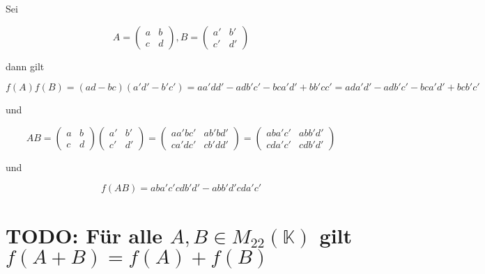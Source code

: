 \documentclass{article}
\begin{document}
Sei

\[
A=
  \begin{pmatrix}
    a & b \\
    c & d
  \end{pmatrix}
,
B=
  \begin{pmatrix}
    a' & b' \\
    c' & d'
  \end{pmatrix}
\]

dann gilt

\[
f(A)f(B)=(ad - bc)(a'd' - b'c') = aa'dd' - adb'c' - bca'd' + bb'cc'
= ada'd' - adb'c' - bca'd' + bcb'c'
\]

und

\[
AB=
  \begin{pmatrix}
    a & b \\
    c & d
  \end{pmatrix}
  \begin{pmatrix}
    a' & b' \\
    c' & d'
  \end{pmatrix}
  =
  \begin{pmatrix}
    aa'bc' & ab'bd' \\
    ca'dc' & cb'dd'
  \end{pmatrix}
  =
  \begin{pmatrix}
    aba'c' & abb'd' \\
    cda'c' & cdb'd'
  \end{pmatrix}
\]

und

\[
f(AB)= aba'c'cdb'd' - abb'd'cda'c'
\]

\section{TODO: Für alle \(A, B\in M_{22}(\mathbb{K})\) gilt \(f(A+B) = f(A) + f(B)\)}
\end{document}
